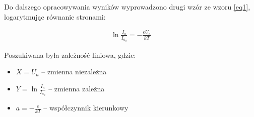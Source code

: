 \documentclass[a4paper]{article}
\begin{document}
Do dalszego opracowywania wyników wyprowadzono drugi wzór ze wzoru \ref{eq1}, logarytmując równanie
stronami:

\begin{align}
	\ln{\frac{I_a}{I_{a_0}}} = -\frac{e U_a}{k T}
\label{eq2}
\end{align}

Poszukiwana była zależność liniowa, gdzie:
\begin{itemize}
\item $X = U_a$ -- zmienna niezależna
\item $Y = \ln \frac{I_a}{I_{a_0}}$ -- zmienna zależna
\item $a = -\frac{e}{kT}$ -- współczynnik kierunkowy
\end{itemize}
%
\end{document}
